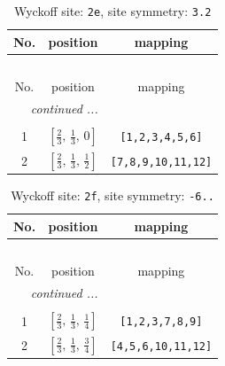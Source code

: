 \documentclass[fleqn,8pt]{jsarticle}
\begin{document}
\begin{longtable}{ccc}
\caption{Wyckoff site: {\tt 2e}, site symmetry: {\tt 3.2}}
 \\
 \hline \hline
No. & position & mapping \\ \hline \endfirsthead

\multicolumn{2}{l}{\tablename\ \thetable{}} \\
 \hline \hline
No. & position & mapping \\ \hline \endhead

 \hline \hline
\multicolumn{2}{r}{\footnotesize\it continued ...} \\ \endfoot

 \hline \hline
\multicolumn{2}{r}{} \\ \endlastfoot

1 & $\left[ \frac{2}{3},\, \frac{1}{3},\, 0 \right]$ & {\tt [1,2,3,4,5,6]} \\ \hline
2 & $\left[ \frac{2}{3},\, \frac{1}{3},\, \frac{1}{2} \right]$ & {\tt [7,8,9,10,11,12]} \\
\end{longtable}
\renewcommand{\arraystretch}{1.2}
\begin{longtable}{ccc}
\caption{Wyckoff site: {\tt 2f}, site symmetry: {\tt -6..}}
 \\
 \hline \hline
No. & position & mapping \\ \hline \endfirsthead

\multicolumn{2}{l}{\tablename\ \thetable{}} \\
 \hline \hline
No. & position & mapping \\ \hline \endhead

 \hline \hline
\multicolumn{2}{r}{\footnotesize\it continued ...} \\ \endfoot

 \hline \hline
\multicolumn{2}{r}{} \\ \endlastfoot

1 & $\left[ \frac{2}{3},\, \frac{1}{3},\, \frac{1}{4} \right]$ & {\tt [1,2,3,7,8,9]} \\ \hline
2 & $\left[ \frac{2}{3},\, \frac{1}{3},\, \frac{3}{4} \right]$ & {\tt [4,5,6,10,11,12]} \\
\end{longtable}
\renewcommand{\arraystretch}{1.2}
\end{document}
